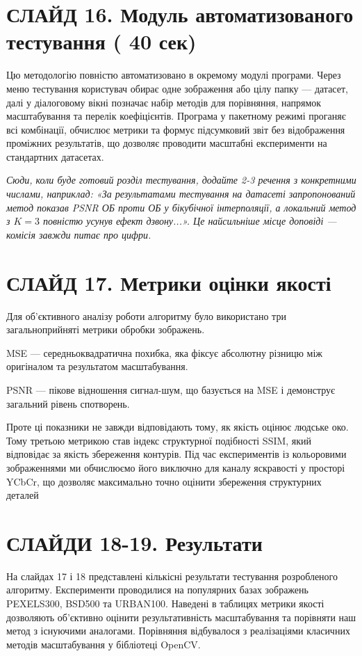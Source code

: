 \documentclass[12pt,a4paper]{article}
\begin{document}
	\section*{СЛАЙД 16. Модуль автоматизованого тестування ( 40 сек)}
	Цю методологію повністю автоматизовано в окремому модулі програми. Через меню тестування користувач обирає одне зображення або цілу папку — датасет, далі у діалоговому вікні позначає набір методів для порівняння, напрямок масштабування та перелік коефіцієнтів. Програма у пакетному режимі проганяє всі комбінації, обчислює метрики та формує підсумковий звіт без відображення проміжних результатів, що дозволяє проводити масштабні експерименти на стандартних датасетах.
	
	\textit{Сюди, коли буде готовий розділ тестування, додайте 2-3 речення з конкретними числами, наприклад: «За результатами тестування на датасеті запропонований метод показав PSNR ОБ проти ОБ у бікубічної інтерполяції, а локальний метод з $K=3$ повністю усунув ефект дзвону...». Це найсильніше місце доповіді — комісія завжди питає про цифри.}
	
	\section*{СЛАЙД 17. Метрики оцінки якості}
	Для об'єктивного аналізу роботи алгоритму було використано три загальноприйняті метрики обробки зображень.
	
	MSE — середньоквадратична похибка, яка фіксує абсолютну різницю між оригіналом та результатом масштабування. 
	
	PSNR — пікове відношення сигнал-шум, що базується на MSE і демонструє загальний рівень спотворень.
	
	Проте ці показники не завжди відповідають тому, як якість оцінює людське око. Тому третьою метрикою став індекс структурної подібності SSIM, який відповідає за якість збереження контурів. Під час експериментів із кольоровими зображеннями ми обчислюємо його виключно для каналу яскравості у просторі YCbCr, що дозволяє максимально точно оцінити збереження структурних деталей
	
	\section*{СЛАЙДИ 18-19. Результати}
	На слайдах 17 і 18 представлені кількісні результати тестування розробленого алгоритму. Експерименти проводилися на популярних базах зображень PEXELS300, BSD500 та URBAN100. Наведені в таблицях метрики якості дозволяють об'єктивно оцінити результативність масштабування та порівняти наш метод з існуючими аналогами. Порівняння відбувалося з реалізаціями класичних методів масштабування у бібліотеці OpenCV.
	
\end{document}
